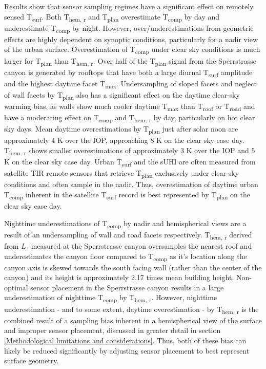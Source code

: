 Results show that sensor sampling regimes have a significant effect on remotely sensed T\textsubscript{surf}. Both T\textsubscript{hem, r} and T\textsubscript{plan} overestimate T\textsubscript{comp} by day and underestimate T\textsubscript{comp} by night. However, over/underestimations from geometric effects are highly dependent on synoptic conditions, particularly for a nadir view of the urban surface. Overestimation of T\textsubscript{comp} under clear sky conditions is much larger for T\textsubscript{plan} than T\textsubscript{hem, r}. Over half of the T\textsubscript{plan} signal from the Sperrstrasse canyon is generated by rooftops that have both a large diurnal T\textsubscript{surf} amplitude and the highest daytime facet T\textsubscript{max}. Undersampling of sloped facets and neglect of wall facets by T\textsubscript{plan} also has a significant effect on the daytime clear-sky warming bias, as walls show much cooler daytime T\textsubscript{max} than T\textsubscript{roof} or T\textsubscript{road} and have a moderating effect on T\textsubscript{comp} and T\textsubscript{hem, r} by day, particularly on hot clear sky days. Mean daytime overestimations by T\textsubscript{plan} just after solar noon are approximately $4$ \si{K} over the IOP, approaching $8$ \si{K} on the clear sky case day. T\textsubscript{hem, r} shows smaller overestimations of approximately $3$ \si{K} over the IOP and $5$ \si{K} on the clear sky case day. Urban T\textsubscript{surf} and the sUHI are often measured from satellite TIR remote sensors that retrieve T\textsubscript{plan} exclusively under clear-sky conditions and often sample in the nadir. Thus, overestimation of daytime urban T\textsubscript{comp} inherent in the satellite T\textsubscript{surf} record is best represented by T\textsubscript{plan} on the clear sky case day. 

Nighttime underestimations of T\textsubscript{comp} by nadir and hemispherical views are a result of an undersampling of wall and road facets respectively. T\textsubscript{hem, r} derived from $L_z$ measured at the Sperrstrasse canyon oversamples the nearest roof and underestimates the canyon floor compared to T\textsubscript{comp} as it's location along the canyon axis is skewed towards the south facing wall (rather than the center of the canyon) and its height is approximately 2.17 times mean building height. Non-optimal sensor placement in the Sperrstrasse canyon results in a large underestimation of nighttime T\textsubscript{comp} by T\textsubscript{hem, r}. However, nighttime underestimation - and to some extent, daytime overestimation - by T\textsubscript{hem, r} is the combined result of a sampling bias inherent in a hemispherical view of the surface and improper sensor placement, discussed in greater detail in section \ref{Methodological limitations and considerations}. Thus, both of these bias can likely be reduced significantly by adjusting sensor placement to best represent surface geometry. 

